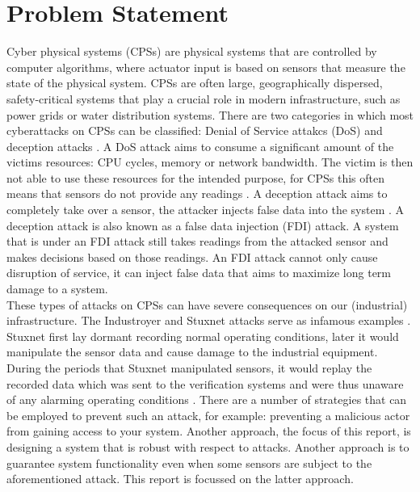 \section{Problem Statement}
Cyber physical systems (CPSs) are physical systems that are controlled by computer algorithms, where actuator input is based on sensors that measure the state of the physical system. CPSs are often large, geographically dispersed, safety-critical systems that play a crucial role in modern infrastructure, such as power grids or water distribution systems. There are two categories in which most cyberattacks on CPSs can be classified: Denial of Service attakcs (DoS) and deception attacks \cite{Ding2021SecureSurvey}. A DoS attack aims to consume a significant amount of the victims resources: CPU cycles, memory or network bandwidth. The victim is then not able to use these resources for the intended purpose, for CPSs this often means that sensors do not provide any readings \cite{Yu2014AnAttacks}. A deception attack aims to completely take over a sensor, the attacker injects false data into the system \cite{Serpanos2022FalseSystems}. A deception attack is also known as a false data injection (FDI) attack. A system that is under an FDI attack still takes readings from the attacked sensor and makes decisions based on those readings. An FDI attack cannot only cause disruption of service, it can inject false data that aims to maximize long term damage to a system. \\ 

These types of attacks on CPSs can have severe consequences on our (industrial) infrastructure. The Industroyer and Stuxnet attacks serve as infamous examples \cite{Lameiras2022Industroyer:Grid}\cite{Kushner2013TheStuxnet}. Stuxnet first lay dormant recording normal operating conditions, later it would manipulate the sensor data and cause damage to the industrial equipment. During the periods that Stuxnet manipulated sensors, it would replay the recorded data which was sent to the verification systems and were thus unaware of any alarming operating conditions \cite{Fidler2011Was_Stuxnet_an_Act_of_War_Decoding_a_Cyberattack}. There are a number of strategies that can be employed to prevent such an attack, for example: preventing a malicious actor from gaining access to your system. Another approach, the focus of this report, is designing a system that is robust with respect to attacks. Another approach is to guarantee system functionality even when some sensors are subject to the aforementioned attack. This report is focussed on the latter approach. \\

